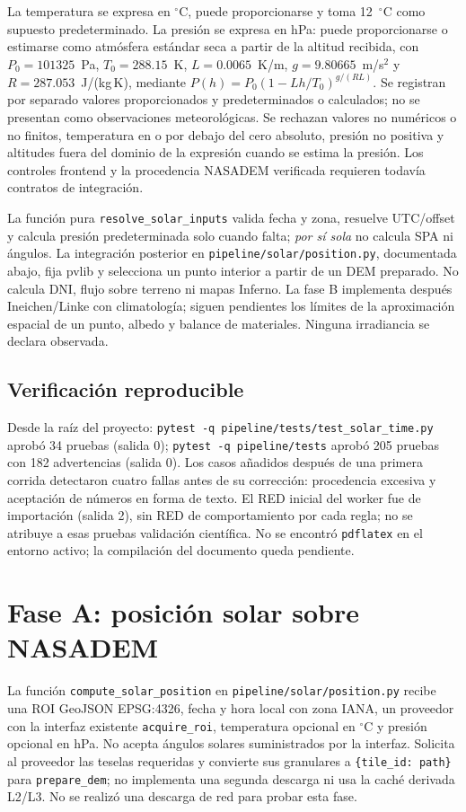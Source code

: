 \documentclass[11pt,a4paper]{article}
\begin{document}
La temperatura se expresa en $^\circ$C, puede proporcionarse y toma 12~$^\circ$C como supuesto predeterminado. La presión se expresa en hPa: puede proporcionarse o estimarse como atmósfera estándar seca a partir de la altitud recibida, con $P_0=101325$~Pa, $T_0=288.15$~K, $L=0.0065$~K/m, $g=9.80665$~m/s$^2$ y $R=287.053$~J/(kg\,K), mediante $P(h)=P_0(1-Lh/T_0)^{g/(RL)}$. Se registran por separado valores proporcionados y predeterminados o calculados; no se presentan como observaciones meteorológicas. Se rechazan valores no numéricos o no finitos, temperatura en o por debajo del cero absoluto, presión no positiva y altitudes fuera del dominio de la expresión cuando se estima la presión. Los controles frontend y la procedencia NASADEM verificada requieren todavía contratos de integración.

La función pura \texttt{resolve\_solar\_inputs} valida fecha y zona, resuelve UTC/offset y calcula presión predeterminada solo cuando falta; \emph{por sí sola} no calcula SPA ni ángulos. La integración posterior en \texttt{pipeline/solar/position.py}, documentada abajo, fija pvlib y selecciona un punto interior a partir de un DEM preparado. No calcula DNI, flujo sobre terreno ni mapas Inferno. La fase B implementa después Ineichen/Linke con climatología; siguen pendientes los límites de la aproximación espacial de un punto, albedo y balance de materiales. Ninguna irradiancia se declara observada.

\subsection{Verificación reproducible}
Desde la raíz del proyecto: \texttt{pytest -q pipeline/tests/test\_solar\_time.py} aprobó 34 pruebas (salida 0); \texttt{pytest -q pipeline/tests} aprobó 205 pruebas con 182 advertencias (salida 0). Los casos añadidos después de una primera corrida detectaron cuatro fallas antes de su corrección: procedencia excesiva y aceptación de números en forma de texto. El RED inicial del worker fue de importación (salida 2), sin RED de comportamiento por cada regla; no se atribuye a esas pruebas validación científica. No se encontró \texttt{pdflatex} en el entorno activo; la compilación del documento queda pendiente.

\section{Fase A: posición solar sobre NASADEM}
La función \texttt{compute\_solar\_position} en \texttt{pipeline/solar/position.py} recibe una ROI GeoJSON EPSG:4326, fecha y hora local con zona IANA, un proveedor con la interfaz existente \texttt{acquire\_roi}, temperatura opcional en $^\circ$C y presión opcional en hPa. No acepta ángulos solares suministrados por la interfaz. Solicita al proveedor las teselas requeridas y convierte sus granulares a \texttt{\{tile\_id: path\}} para \texttt{prepare\_dem}; no implementa una segunda descarga ni usa la caché derivada L2/L3. No se realizó una descarga de red para probar esta fase.
\end{document}
